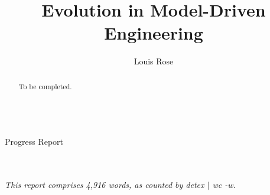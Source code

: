 \documentclass[a4paper,10pt]{article}
\title{Evolution in Model-Driven Engineering}
\author{Louis Rose}
\makeatletter
\renewcommand{\maketitle}{
  \begin{titlepage}
    \center
    \vspace*{\stretch{1}}
    \textsf{\huge \bfseries\sf \@title}\\
    \bigskip
    {\LARGE Progress Report}\\
    \vspace*{\stretch{1}}
    {\Large \@author}\\
    \bigskip
    {\Large \@date}\\
    \vspace*{\stretch{2}}
  \end{titlepage}
}
\makeatother
\begin{document}

\maketitle

\begin{abstract}
To be completed.
\end{abstract}

\vspace{2mm}

\begin{center}
  \small{\textit{This report comprises 4,916 words, as counted by detex $|$ wc -w.}}
\end{center}

\newpage
\tableofcontents
\newpage








\end{document}
